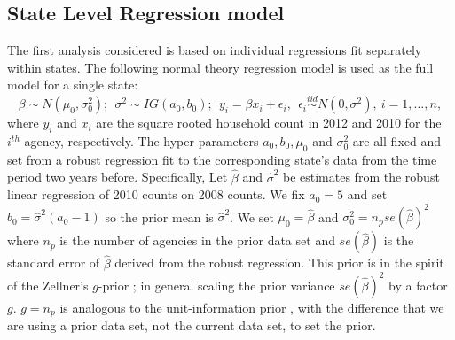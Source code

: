 \documentclass[ba]{imsart}
\def\bbeta{\mbox{\boldmath $\beta$}}
\def\bmu{\mbox{\boldmath $\mu$}}
\newcommand{\bx}{\mbox{\boldmath $x$}}
\newcommand{\iid}{\stackrel{iid}{\sim}}
\begin{document}
\subsection{State Level Regression model}
\label{regModelNW}
The first analysis considered is based on individual regressions fit separately within states.  The following normal theory regression model is used as the full model for a single state:
\begin{equation}
\label{eq:regModel}
\beta\sim N(\mu_0, \sigma^{2}_0);\ \ \sigma^2\sim IG(a_0,b_0);\ \  
y_{i}=\beta x_{i} +\epsilon_{i},\ \ \epsilon_{i}\iid N(0, \sigma^2),\ i=1,\dots, n, 
\end{equation}
where $y_{i}$ and $x_{i}$ are the square rooted household count in 2012 and 2010 for the $i^{th}$ agency, respectively. 
The hyper-parameters $a_0, b_0, \mu_0$ and $\sigma^{2}_0$ are all fixed and set from a 
robust regression fit to the corresponding state's data from the time period two years
before. Specifically, Let $\hat\beta$ and $\hat\sigma^{2}$ be estimates from the robust linear regression of 2010 counts on 2008 counts.  We fix $a_0 = 5$ and set $b_0 = \hat\sigma^{2}(a_0 - 1)$ so the prior mean is $\hat\sigma^{2}$. We set $\mu_0 = \hat\beta$ and $\sigma^{2}_0 =  n_{p}se(\hat\beta)^{2}$ where $n_{p}$ is the number of agencies in the prior data set and $se(\hat\beta)$ is the standard error of $\hat\beta$ derived from the robust regression. %
This prior is in the spirit of the Zellner's $g$-prior \citep{zellner1986, liang2008}; in general scaling the prior variance $se(\hat\beta)^{2}$ by a factor $g$. $g = n_{p}$ is analogous to the unit-information prior \citep{kass1995reference}, with the difference that we are using a prior data set, not the current data set, to set the prior. %
\end{document}
